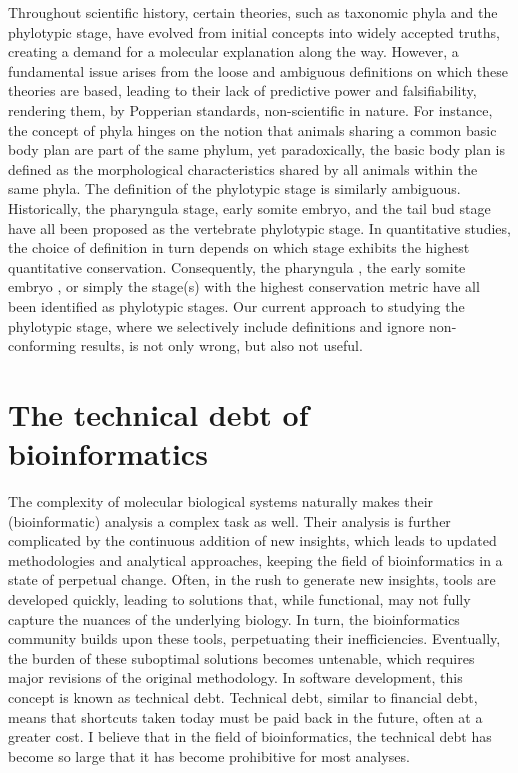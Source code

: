Throughout scientific history, certain theories, such as taxonomic phyla and the phylotypic stage, have evolved from initial concepts into widely accepted truths, creating a demand for a molecular explanation along the way. However, a fundamental issue arises from the loose and ambiguous definitions on which these theories are based, leading to their lack of predictive power and falsifiability, rendering them, by Popperian standards, non-scientific in nature. For instance, the concept of phyla hinges on the notion that animals sharing a common basic body plan are part of the same phylum, yet paradoxically, the basic body plan is defined as the morphological characteristics shared by all animals within the same phyla\cite{BUDD2000,scholtz2004bauplane}. The definition of the phylotypic stage is similarly ambiguous. Historically, the pharyngula stage\cite{BALLARD1981}, early somite embryo\cite{Alberch1993}, and the tail bud stage \cite{Slack1993} have all been proposed as the vertebrate phylotypic stage. In quantitative studies, the choice of definition in turn depends on which stage exhibits the highest quantitative conservation. Consequently, the pharyngula \cite{Irie2011,marletaz2018}, the early somite embryo \cite{DomazetLoso2010}, or simply the stage(s) with the highest conservation metric\cite{Kalinka2010,Cordero2020} have all been identified as phylotypic stages. Our current approach to studying the phylotypic stage, where we selectively include definitions and ignore non-conforming results, is not only wrong, but also not useful.

\section{The technical debt of bioinformatics}

The complexity of molecular biological systems naturally makes their (bioinformatic) analysis a complex task as well. Their analysis is further complicated by the continuous addition of new insights, which leads to updated methodologies and analytical approaches, keeping the field of bioinformatics in a state of perpetual change. Often, in the rush to generate new insights, tools are developed quickly, leading to solutions that, while functional, may not fully capture the nuances of the underlying biology. In turn, the bioinformatics community builds upon these tools, perpetuating their inefficiencies. Eventually, the burden of these suboptimal solutions becomes untenable, which requires major revisions of the original methodology. In software development, this concept is known as technical debt. Technical debt, similar to financial debt, means that shortcuts taken today must be paid back in the future, often at a greater cost. I believe that in the field of bioinformatics, the technical debt has become so large that it has become prohibitive for most analyses.

